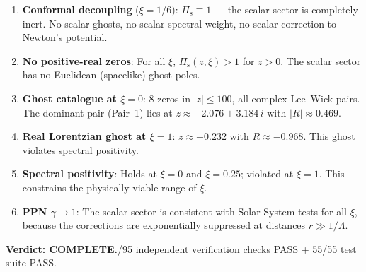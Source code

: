 \documentclass[11pt,a4paper]{article}
\newcommand{\Pis}{\Pi_{\mathrm{s}}}
\begin{document}
\begin{enumerate}
  \item \textbf{Conformal decoupling} ($\xi = 1/6$):
    $\Pis \equiv 1$ --- the scalar sector is completely inert.
    No scalar ghosts, no scalar spectral weight, no scalar correction
    to Newton's potential.

  \item \textbf{No positive-real zeros}: For all $\xi$, $\Pis(z,\xi) > 1$
    for $z > 0$.  The scalar sector has no Euclidean (spacelike) ghost poles.

  \item \textbf{Ghost catalogue at $\xi = 0$}: 8 zeros in $|z| \leq 100$,
    all complex Lee--Wick pairs.  The dominant pair (Pair~1) lies at
    $z \approx -2.076 \pm 3.184\,i$ with $|R| \approx 0.469$.

  \item \textbf{Real Lorentzian ghost at $\xi = 1$}:
    $z \approx -0.232$ with $R \approx -0.968$.  This ghost violates
    spectral positivity.

  \item \textbf{Spectral positivity}: Holds at $\xi = 0$ and $\xi = 0.25$;
    violated at $\xi = 1$.  This constrains the physically viable range
    of $\xi$.

  \item \textbf{PPN $\gamma \to 1$}: The scalar sector is consistent
    with Solar System tests for all $\xi$, because the corrections are
    exponentially suppressed at distances $r \gg 1/\Lambda$.
\end{enumerate}

\bigskip\noindent
\textbf{Verdict: COMPLETE.}/95 independent verification checks PASS + 55/55 test suite PASS.
\end{document}
